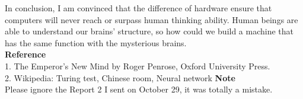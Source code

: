 \documentclass[11pt]{article}
\begin{document}
In conclusion, I am convinced that the difference of hardware ensure that computers will never reach or surpass human thinking ability. Human beings are able to understand our brains' structure, so how could we build a machine that has the same function with the mysterious brains.  \\

\textbf{Reference} \\
1. The Emperor's New Mind by Roger Penrose, Oxford University Press. \\
2. Wikipedia: Turing test, Chinese room, Neural network
\textbf{Note} \\
Please ignore the Report 2 I sent on October 29, it was totally a mistake.
\end{document}
